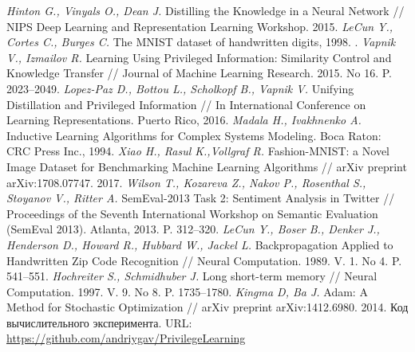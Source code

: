 \documentclass[12pt]{a&t}
\begin{document}
\begin{thebibliography}{10}
        \textit{Hinton G., Vinyals O., Dean J.} Distilling the Knowledge in a Neural Network // NIPS Deep Learning and Representation Learning Workshop. 2015.
	\textit{LeCun Y.,  Cortes C., Burges C.} The MNIST dataset of handwritten digits, 1998. .
	\textit{Vapnik V., Izmailov R.} Learning Using Privileged Information: Similarity Control and Knowledge Transfer // Journal of Machine Learning Research. 2015. No 16. P. 2023--2049.
	\textit{Lopez-Paz D., Bottou L., Scholkopf B., Vapnik V.} Unifying Distillation and Privileged Information // In International Conference on Learning Representations. Puerto Rico, 2016.
	\textit{Madala H., Ivakhnenko A.} Inductive Learning Algorithms for Complex Systems Modeling. Boca Raton: CRC Press Inc., 1994.
	\textit{Xiao H., Rasul K.,Vollgraf R.} Fashion-MNIST: a Novel Image Dataset for Benchmarking Machine Learning Algorithms // arXiv preprint arXiv:1708.07747. 2017.
	\textit{Wilson T., Kozareva Z., Nakov P., Rosenthal S., Stoyanov V., Ritter A.} {S}em{E}val-2013 Task 2: Sentiment Analysis in Twitter // Proceedings of the Seventh International Workshop on Semantic Evaluation ({S}em{E}val 2013). Atlanta, 2013. P. 312--320.
	\textit{LeCun Y., Boser B., Denker J., Henderson D., Howard R., Hubbard W., Jackel L.} Backpropagation Applied to Handwritten Zip Code Recognition // Neural Computation. 1989. V. 1. No 4. P. 541--551.
	\textit{Hochreiter S., Schmidhuber J.} Long short-term memory // Neural Computation. 1997. V. 9. No 8.  P. 1735--1780.
	\textit{Kingma D, Ba J.} Adam: A Method for Stochastic Optimization // arXiv preprint arXiv:1412.6980. 2014.
	Код вычислительного эксперимента. URL: \url{https://github.com/andriygav/PrivilegeLearning}
 \end{thebibliography}


\end{document}
